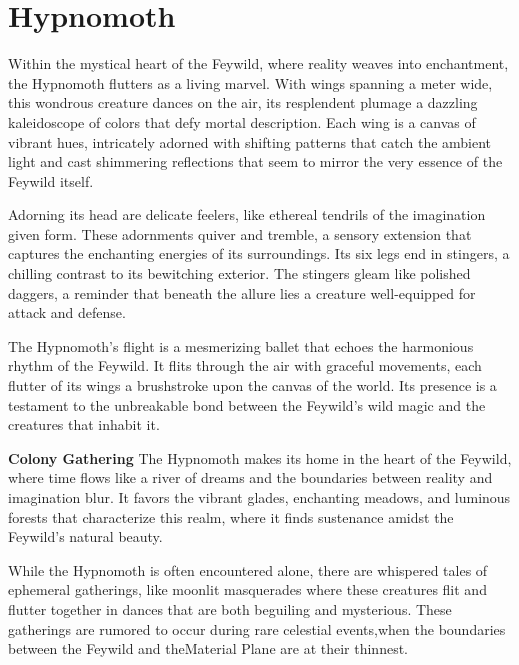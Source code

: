 \MonsterSheetGeometry

\newcommand{\artPageCounter}{\thepage}

\chapter*{Hypnomoth}

\entryfont Within the mystical heart of the Feywild, where reality weaves into enchantment, the Hypnomoth flutters as a living marvel. With wings spanning a meter wide, this wondrous creature dances on the air, its resplendent plumage a dazzling kaleidoscope of colors that defy mortal description. Each wing is a canvas of vibrant hues, intricately adorned with shifting patterns that catch the ambient light and cast shimmering reflections that seem to mirror the very essence of the Feywild itself.

Adorning its head are delicate feelers, like ethereal tendrils of the imagination given form. These adornments quiver and tremble, a sensory extension that captures the enchanting energies of its surroundings. Its six legs end in stingers, a chilling contrast to its bewitching exterior. The stingers gleam like polished daggers, a reminder that beneath the allure lies a creature well-equipped for attack and defense.

The Hypnomoth's flight is a mesmerizing ballet that echoes the harmonious rhythm of the Feywild. It flits through the air with graceful movements, each flutter of its wings a brushstroke upon the canvas of the world. Its presence is a testament to the unbreakable bond between the Feywild's wild magic and the creatures that inhabit it.

\textbf{Colony Gathering} The Hypnomoth makes its home in the heart of the Feywild, where time flows like a river of dreams and the boundaries between reality and imagination blur. It favors the vibrant glades, enchanting meadows, and luminous forests that characterize this realm, where it finds sustenance amidst the Feywild's natural beauty.

While the Hypnomoth is often encountered alone, there are whispered tales of ephemeral gatherings, like moonlit masquerades where these creatures flit and flutter together in dances that are both beguiling and mysterious. These gatherings are rumored to occur during rare celestial events,\linebreak\hspace*{2em}when the boundaries between the Feywild and the\linebreak\hspace*{3.5em}Material Plane are at their thinnest.

